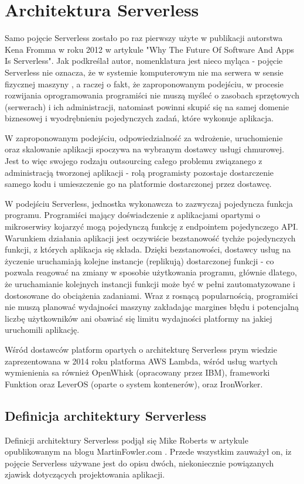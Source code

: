 \documentclass[oneside]{mgr}
\begin{document}
\section{Architektura Serverless}
Samo pojęcie Serverless zostało po raz pierwszy użyte w publikacji autorstwa Kena Fromma w roku 2012 w artykule "Why The Future Of Software And Apps Is Serverless". Jak podkreślał autor, nomenklatura jest nieco myląca - pojęcie Serverless nie oznacza, że w systemie komputerowym nie ma serwera w sensie fizycznej maszyny \cite{kenFrommFutureIsServerless}, a raczej o fakt, że zaproponowanym podejściu, w procesie rozwijania oprogramowania programiści nie muszą myśleć o zasobach sprzętowych (serwerach) i ich administracji, natomiast powinni skupić się na samej domenie biznesowej i wyodrębnieniu pojedynczych zadań, które wykonuje aplikacja.

W zaproponowanym podejściu, odpowiedzialność za wdrożenie, uruchomienie oraz skalowanie aplikacji spoczywa na wybranym dostawcy usługi chmurowej. Jest to więc swojego rodzaju outsourcing całego problemu związanego z administracją tworzonej aplikacji - rolą programisty pozostaje dostarczenie samego kodu i umieszczenie go na platformie dostarczonej przez dostawcę.

W podejściu Serverless, jednostka wykonawcza to zazwyczaj pojedyncza funkcja programu. Programiści mający doświadczenie z aplikacjami opartymi o mikroserwisy kojarzyć mogą pojedynczą funkcję z endpointem pojedynczego API. Warunkiem działania aplikacji jest oczywiście bezstanowość tychże pojedynczych funkcji, z których aplikacja się składa. Dzięki bezstanowości, dostawcy usług na życzenie uruchamiają kolejne instancje (replikują) dostarczonej funkcji - co pozwala reagować na zmiany w sposobie użytkowania programu, głównie dlatego, że uruchamianie kolejnych instancji funkcji może być w pełni zautomatyzowane i dostosowane do obciążenia zadaniami. Wraz z rosnącą popularnością, programiści nie muszą planować wydajności maszyny zakładając margines błędu i potencjalną liczbę użytkowników ani obawiać się limitu wydajności platformy na jakiej uruchomili aplikację.

Wśród dostawców platform opartych o architekturę Serverless prym wiedzie zaprezentowana w 2014 roku platforma AWS Lambda, wśród usług wartych wymienienia sa również OpenWhisk (opracowany przez IBM), frameworki Funktion oraz LeverOS (oparte o system kontenerów), oraz IronWorker.

\subsection{Definicja architektury Serverless}
Definicji architektury Serverless podjął się Mike Roberts w artykule opublikowanym na blogu MartinFowler.com \cite{martinFowlerServerless}. Przede wszystkim zauważył on, iz pojęcie Serverless używane jest do opisu dwóch, niekoniecznie powiązanych zjawisk dotyczących projektowania aplikacji.
\end{document}
